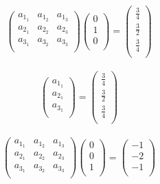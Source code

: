 \documentclass{article}
\begin{document}
    \\
    \begin{equation*}
        \begin{pmatrix}
            a_1_1& a_1_2& a_1_3\\
            a_2_1& a_2_2& a_2_3\\
            a_3_1& a_3_2& a_3_3\\
            
        \end{pmatrix}
        \begin{pmatrix}
            0\\
            1\\
            0\\
        \end{pmatrix}
        =
        \begin{pmatrix}
            \frac{3}{4}\\
            \frac{3}{2}\\
            \frac{3}{4}\\
        \end{pmatrix}
    \end{equation*}
    \\
    \begin{equation*}
        \begin{pmatrix}
            a_1_1\\
            a_2_1\\
            a_3_1\\
        \end{pmatrix}
        =
        \begin{pmatrix}
            \frac{3}{4}\\
            \frac{3}{2}\\
            \frac{3}{4}\\
        \end{pmatrix}
    \end{equation*}
    \\
    \begin{equation*}
        \begin{pmatrix}
            a_1_1& a_1_2& a_1_3\\
            a_2_1& a_2_2& a_2_3\\
            a_3_1& a_3_2& a_3_3\\
            
        \end{pmatrix}
        \begin{pmatrix}
            0\\
            0\\
            1\\
        \end{pmatrix}
        =
        \begin{pmatrix}
            -1\\
            -2\\
            -1\\
        \end{pmatrix}
    \end{equation*}
\end{document}
